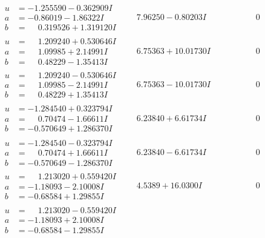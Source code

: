 \documentclass[1p]{elsarticle_modified}
\theoremstyle{definition}
\begin{document}
$$\begin{array}{c|c|c}
\begin{aligned}
u &= -1.255590 - 0.362909 I \\
a &= -0.86019 - 1.86322 I \\
b &= \phantom{-}0.319526 + 1.319120 I\end{aligned}
 & \phantom{-}7.96250 - 0.80203 I & \phantom{-0.000000 } 0 \\ \hline\begin{aligned}
u &= \phantom{-}1.209240 + 0.530646 I \\
a &= \phantom{-}1.09985 + 2.14991 I \\
b &= \phantom{-}0.48229 - 1.35413 I\end{aligned}
 & \phantom{-}6.75363 + 10.01730 I & \phantom{-0.000000 } 0 \\ \hline\begin{aligned}
u &= \phantom{-}1.209240 - 0.530646 I \\
a &= \phantom{-}1.09985 - 2.14991 I \\
b &= \phantom{-}0.48229 + 1.35413 I\end{aligned}
 & \phantom{-}6.75363 - 10.01730 I & \phantom{-0.000000 } 0 \\ \hline\begin{aligned}
u &= -1.284540 + 0.323794 I \\
a &= \phantom{-}0.70474 - 1.66611 I \\
b &= -0.570649 + 1.286370 I\end{aligned}
 & \phantom{-}6.23840 + 6.61734 I & \phantom{-0.000000 } 0 \\ \hline\begin{aligned}
u &= -1.284540 - 0.323794 I \\
a &= \phantom{-}0.70474 + 1.66611 I \\
b &= -0.570649 - 1.286370 I\end{aligned}
 & \phantom{-}6.23840 - 6.61734 I & \phantom{-0.000000 } 0 \\ \hline\begin{aligned}
u &= \phantom{-}1.213020 + 0.559420 I \\
a &= -1.18093 - 2.10008 I \\
b &= -0.68584 + 1.29855 I\end{aligned}
 & \phantom{-}4.5389 + 16.0300 I & \phantom{-0.000000 } 0 \\ \hline\begin{aligned}
u &= \phantom{-}1.213020 - 0.559420 I \\
a &= -1.18093 + 2.10008 I \\
b &= -0.68584 - 1.29855 I\end{aligned}

\end{array}$$
\end{document}
